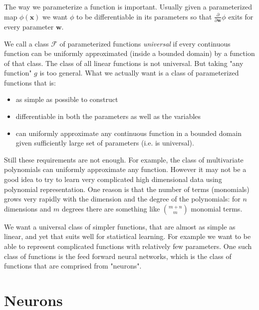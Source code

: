 \documentclass[11pt, a4paper]{report}
\theoremstyle{plain}
\theoremstyle{definition}
\theoremstyle{remark}
\newcommand{\R}{\mathbb{R}}
\newcommand{\x}{\mathbf{x}}
\newcommand{\w}{\mathbf{w}}
\begin{document}
The way we parameterize a function is important. Usually given a parameterized
map $\phi (\x)$ we want $\phi$ to be differentiable in its parameters so that
$\frac{\partial}{\partial \w} \phi$ exits for every parameter $\w$. 



We call a class $\mathcal{F}$ of parameterized functions \emph{universal} if
every continuous function can be uniformly approximated (inside a bounded
domain) by a function of that class. The class of all linear functions is not
universal. But taking "any function" $g$ is too general. What we actually want
is a class of parameterized functions that is:
\begin{itemize}
\item{} as simple as possible to construct
\item{} differentiable in both the parameters as well as the variables
\item{} can uniformly approximate any continuous function in a bounded domain
given sufficiently large set of
parameters (i.e. is universal).
\end{itemize}

Still these requirements are not enough. For example, the class of multivariate
polynomials can uniformly approximate any function. However it may not be a good
idea to try to learn very complicated high dimensional data using polynomial
representation. One reason is that the number of terms (monomials) grows very
rapidly with the dimension and the degree of the polynomials: for $n$ dimensions
and $m$ degrees there are something like $\binom{m + n}{m}$ monomial terms.

We want a universal class of simpler functions, that are almost as simple as
linear, and yet that suits well for statistical learning. For example we want to
be able to represent complicated functions with relatively few parameters. One
such class of functions is the feed forward neural networks, which is the class
of functions that are comprised from "neurons".

\section{Neurons}
\end{document}
